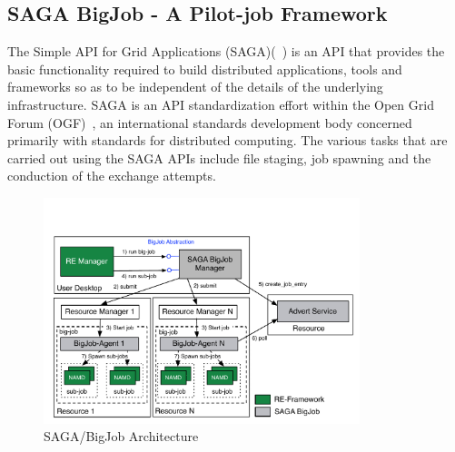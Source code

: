 \documentclass{rspublic}
\newcommand{\jhanote}[1]{ {\textcolor{red} { ***shantenu: #1 }}}
\newcommand{\alnote}[1]{ {\textcolor{blue} { ***andre: #1 }}}
\newcommand{\alnote}[1]{}
\newcommand{\jhanote}[1]{}
\begin{document}
  

\subsection{SAGA BigJob - A Pilot-job Framework}
\label{sec:BigJob}

The Simple API for Grid Applications (SAGA)(~\citep{saga_gfd90}) is an
API that provides the basic functionality required to build
distributed applications, tools and frameworks so as to be independent
of the details of the underlying infrastructure. SAGA is an API
standardization effort within the Open Grid Forum
(OGF)~\citep{ogf_web}, an international standards development body
concerned primarily with standards for distributed computing. The
various tasks that are carried out using the SAGA APIs include file
staging, job spawning and the conduction of the exchange attempts.


\begin{figure}[t]
      \centering
          \includegraphics[width=0.82\textwidth]{../figures/Bigjob_arch.pdf}
          \caption{\footnotesize SAGA/BigJob Architecture
              }
      \label{fig:bigjob}
\end{figure}
\end{document}
